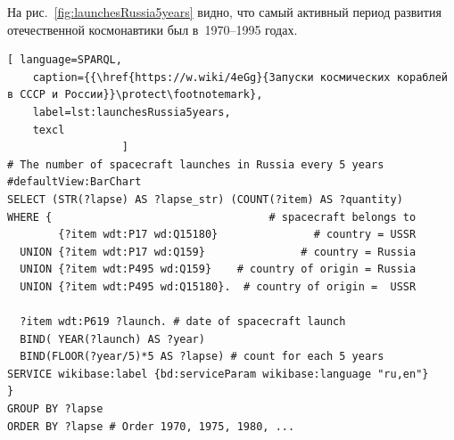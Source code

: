 На рис.~\ref{fig:launchesRussia5years} видно, 
что самый активный период развития отечественной космонавтики был в~1970--1995 годах.



\newpage


\begin{lstlisting}[ language=SPARQL, 
    caption={{\href{https://w.wiki/4eGg}{Запуски космических кораблей в СССР и России}}\protect\footnotemark}, 
    label=lst:launchesRussia5years,
    texcl
                  ]
# The number of spacecraft launches in Russia every 5 years
#defaultView:BarChart
SELECT (STR(?lapse) AS ?lapse_str) (COUNT(?item) AS ?quantity)
WHERE {                                  # spacecraft belongs to
        {?item wdt:P17 wd:Q15180}               # country = USSR
  UNION {?item wdt:P17 wd:Q159}               # country = Russia
  UNION {?item wdt:P495 wd:Q159}    # country of origin = Russia
  UNION {?item wdt:P495 wd:Q15180}.  # country of origin =  USSR
  
  ?item wdt:P619 ?launch. # date of spacecraft launch
  BIND( YEAR(?launch) AS ?year) 
  BIND(FLOOR(?year/5)*5 AS ?lapse) # count for each 5 years
SERVICE wikibase:label {bd:serviceParam wikibase:language "ru,en"}
} 
GROUP BY ?lapse
ORDER BY ?lapse # Order 1970, 1975, 1980, ...
\end{lstlisting}



